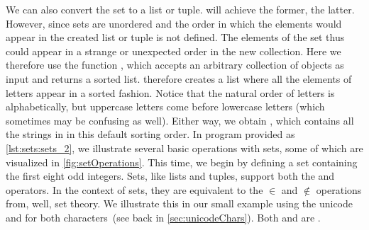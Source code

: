 We can also convert the set  to a list or tuple.
 will achieve the former,  the latter.
However, since sets are unordered and the order in which the elements would appear in the created list or tuple is not defined.
The elements of the set thus could appear in a strange or unexpected order in the new collection.
Here we therefore use the function , which accepts an arbitrary collection of objects as input and returns a sorted list.
 therefore creates a list where all the elements of letters appear in a sorted fashion.
Notice that the natural order of letters is alphabetically, but uppercase letters come before lowercase letters (which sometimes may be confusing as well).
Either way, we obtain , which contains all the strings in  in this default sorting order.%
%
%
%
In program  provided as \cref{lst:sets:sets_2}, we illustrate several basic operations with sets, some of which are visualized in \cref{fig:setOperations}.
This time, we begin by defining a set  containing the first eight odd integers.
Sets, like lists and tuples, support both the  and  operators.
In the context of sets, they are equivalent to the $\in$ and $\notin$ operations from, well, set theory.
We illustrate this in our small example using the unicode ~ and  for both characters~(see back in \cref{sec:unicodeChars}).
Both  and  are .%
%
